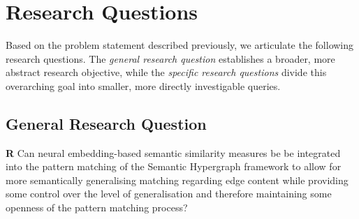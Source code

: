 \documentclass[11pt]{scrreprt}
\begin{document}
\section{Research Questions}
\label{sec:research-questions}
Based on the problem statement described previously, we articulate the following research questions. The \textit{general research question} establishes a broader, more abstract research objective, while the \textit{specific research questions} divide this overarching goal into smaller, more directly investigable queries.

\subsection{General Research Question}
\textbf{R} Can neural embedding-based semantic similarity measures be be integrated into the pattern matching of the Semantic Hypergraph framework to allow for more semantically generalising matching regarding edge content while providing some control over the level of generalisation and therefore maintaining some openness of the pattern matching process?
\end{document}
